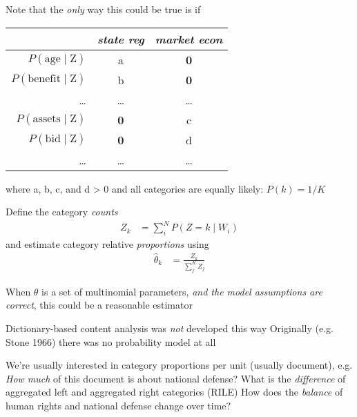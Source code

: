 \documentclass{mediumfoils}
\begin{document}
Note that the \textit{only} way this could be true is if 
\begin{center}
\begin{tabular}{rcc} \toprule
 & \textsl{state reg} & \textsl{market econ} \\ \midrule
$P(\text{age} \mid \text{Z})$ & a & \textbf{0} \\
$P(\text{benefit} \mid \text{Z})$ & b & \textbf{0} \\
\ldots & \ldots & \ldots\\
$P(\text{assets} \mid  \text{Z})$ & \textbf{0} & c \\
$P(\text{bid}  \mid  \text{Z})$& \textbf{0} & d\\
\ldots & \ldots & \ldots\\ \bottomrule
\end{tabular}
\end{center}
where a, b, c, and d > 0
{and} all categories are equally likely: $P(k)=1/K$



Define the category \textit{counts}
\begin{align*}
Z_k & = \sum^N_{i} P(Z = k \mid W_i)
\end{align*}
and estimate category relative \textit{proportions} using
\begin{align*}
\hat{\theta}_k &= \frac{Z_k}{\sum^K_{j} Z_j}
\end{align*}

When $\theta$ is a set of multinomial parameters, \textit{and the model assumptions are correct},
this could be a reasonable estimator


Dictionary-based content analysis was \textit{not} developed this way
\ita
\itm Originally (e.g. Stone 1966) there was no probability model at all
\itz




We're usually interested in category proportions per unit (usually document), e.g.
\ita
\itm \textsl{How much} of this document is about national defense?
\itm What is the \textsl{difference} of aggregated left and aggregated right categories (RILE)
\itm How does the \textsl{balance} of human rights and national defense change over time?
\itz
\end{document}
